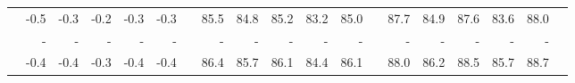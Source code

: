 \begin{tabular}{lrrrrrrrrrrrrrrrrrr}
\cellcolor{speechllmcolor}{\voxtral} & \cellcolor{Brown3!2} -0.5 & \cellcolor{Brown3!1} -0.3 & \cellcolor{Brown3!1} -0.2 & \cellcolor{Brown3!1} -0.3 & \cellcolor{Brown3!2} -0.3 &  & \cellcolor{Chartreuse3!100} 85.5 & \cellcolor{Chartreuse3!100} 84.8 & \cellcolor{Chartreuse3!100} 85.2 & \cellcolor{Chartreuse3!100} 83.2 & \cellcolor{Chartreuse3!100} 85.0 &  & \cellcolor{DarkSlateGray3!100} 87.7 & \cellcolor{DarkSlateGray3!100} 84.9 & \cellcolor{DarkSlateGray3!100} 87.6 & \cellcolor{DarkSlateGray3!100} 83.6 & \cellcolor{DarkSlateGray3!100} 88.0 &  \\
\cellcolor{speechllmcolor}{\spire} & - & - & - & - & - &  & - & - & - & - & - &  & - & - & - & - & - &  \\
\cellcolor{speechllmcolor}{\qwen3omni} & \cellcolor{Brown3!2} -0.4 & \cellcolor{Brown3!2} -0.4 & \cellcolor{Brown3!1} -0.3 & \cellcolor{Brown3!2} -0.4 & \cellcolor{Brown3!2} -0.4 &  & \cellcolor{Chartreuse3!100} 86.4 & \cellcolor{Chartreuse3!100} 85.7 & \cellcolor{Chartreuse3!100} 86.1 & \cellcolor{Chartreuse3!100} 84.4 & \cellcolor{Chartreuse3!100} 86.1 &  & \cellcolor{DarkSlateGray3!100} 88.0 & \cellcolor{DarkSlateGray3!100} 86.2 & \cellcolor{DarkSlateGray3!100} 88.5 & \cellcolor{DarkSlateGray3!100} 85.7 & \cellcolor{DarkSlateGray3!100} 88.7 &  \\
\bottomrule \end{tabular}
